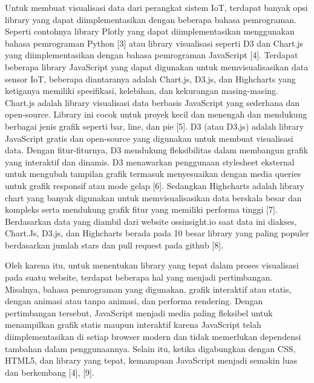 Untuk membuat visualisasi data dari perangkat sistem IoT, terdapat banyak opsi library yang dapat diimplementasikan dengan beberapa bahasa pemrograman. Seperti contohnya library Plotly yang dapat diimplementasikan menggunakan bahasa pemrograman Python [3] atau library visualisasi seperti D3 dan Chart.js yang diimplementasikan dengan bahasa pemrograman JavaScript [4]. Terdapat beberapa library JavaScript yang dapat digunakan untuk memvisualisasikan data sensor IoT, beberapa diantaranya adalah Chart.js, D3.js, dan Highcharts yang ketiganya memiliki spesifikasi, kelebihan, dan kekurangan masing-masing. Chart.js adalah library visualisasi data berbasis JavaScript yang sederhana dan open-source. Library ini cocok untuk proyek kecil dan menengah dan mendukung berbagai jenis grafik seperti bar, line, dan pie [5]. D3 (atau D3.js) adalah library JavaScript gratis dan open-source yang digunakan untuk membuat visualisasi data. Dengan fitur-fiturnya, D3 mendukung fleksibilitas dalam membangun grafik yang interaktif dan dinamis. D3 menawarkan penggunaan stylesheet eksternal untuk mengubah tampilan grafik termasuk menyesuaikan dengan media queries untuk grafik responsif atau mode gelap [6]. Sedangkan Highcharts adalah library chart yang banyak digunakan untuk memvisualisasikan data berskala besar dan kompleks serta mendukung grafik fitur yang memiliki performa tinggi [7]. Berdasarkan data yang diambil dari website ossinsight.io saat data ini diakses, Chart.Js, D3.js, dan Highcharts berada pada 10 besar library yang paling populer berdasarkan jumlah stars dan pull request pada github [8].

Oleh karena itu, untuk menentukan library yang tepat dalam proses visualisasi pada suatu website, terdapat beberapa hal yang menjadi pertimbangan. Misalnya, bahasa pemrograman yang digunakan, grafik interaktif atau statis, dengan animasi atau tanpa animasi, dan performa rendering. Dengan pertimbangan tersebut, JavaScript menjadi media paling fleksibel untuk menampilkan grafik statis maupun interaktif karena JavaScript telah diimplementasikan di setiap browser modern dan tidak memerlukan dependensi tambahan dalam penggunaannya. Selain itu, ketika digabungkan dengan CSS, HTML5, dan library yang tepat, kemampuan JavaScript menjadi semakin luas dan berkembang [4], [9].

